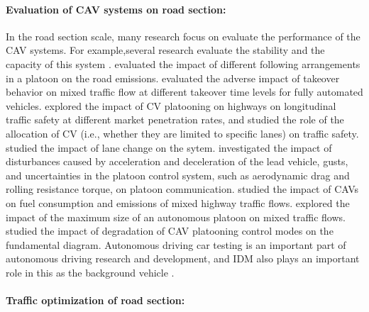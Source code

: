 \documentclass[a4paper,fleqn]{cas-sc}
\begin{document}
\paragraph{\textbf{Evaluation of CAV systems on road section:}}
In the road section scale, many research focus on evaluate the performance of the CAV systems. For example,several research evaluate the stability and the capacity of this system \citep{qin_analytical_2021,qinStabilityAnalysisConnectedVehicles2023a,sunStabilityExtensionCarFollowingModel2023b,sunRelationshipCarFollowingString2020b,shang_impacts_2021,talebpourEffectInformationAvailabilityStability2018a,talebpourInfluenceConnectedAutonomousVehicles2016a,wang_stability_2019,yao_linear_2021,zhou_analytical_2021}. \cite{alhariqiImpactVehicleArrangementMixed2023a,zhou_modeling_2020} evaluated the impact of different following arrangements in a platoon on the road emissions.\cite{mullakkal-babu_comparative_2022} evaluated the adverse impact of takeover behavior on mixed traffic flow at different takeover time levels for fully automated vehicles.\cite{rahman_longitudinal_2018} explored the impact of CV platooning on highways on longitudinal traffic safety at different market penetration rates, and studied the role of the allocation of CV (i.e., whether they are limited to specific lanes) on traffic safety.\cite{wangEgoEfficientLaneChangesConnected2022a} studied the impact of lane change on the sytem.\cite{wuTimeDependentPerformanceAnalysis80211pBased2020a} investigated the impact of disturbances caused by acceleration and deceleration of the lead vehicle, gusts, and uncertainties in the platoon control system, such as aerodynamic drag and rolling resistance torque, on platoon communication.
\cite{yao_fuel_2021} studied the impact of CAVs on fuel consumption and emissions of mixed highway traffic flows. \cite{yaoAnalysisImpactMaximumPlatoon2023a} explored the impact of the maximum size of an autonomous platoon on mixed traffic flows. \cite{zhou_impact_2021} studied
the impact of degradation of CAV platooning control modes on the fundamental diagram. Autonomous driving car testing is an important part of autonomous driving research and development, and IDM also plays an important role in this as the background vehicle \citep{sun_scenario-based_2022,li_scegene_2022,sun_adaptive_2022,cao_autonomous_2023,zhang_accelerated_2024,zhang_bayesian_2024}. 

\paragraph{\textbf{Traffic optimization of road section:}}
\end{document}
